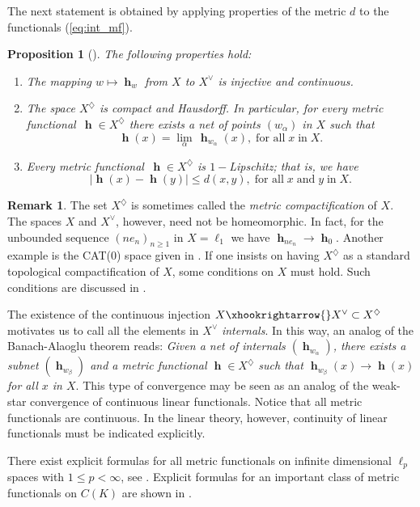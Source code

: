 \documentclass[a4paper,12pt]{article}
\newtheorem{prop}[thm]{Proposition}
\theoremstyle{definition}
\newtheorem{rem}[thm]{Remark}
\DeclareMathOperator{\h}{\mathbf{h}}
\newcommand{\abs}[1]{\lvert#1\rvert}
\numberwithin{equation}{section}
\begin{document}
The next statement is obtained by applying properties of the metric $d$ to the 
functionals (\ref{eq:int_mf}).
\begin{prop}[{\cite[Chapter~3]{GutierrezThesis}}]
The following properties hold:
\begin{enumerate}
	\item The mapping $w\mapsto\h_w$ from $X$ to $X^\vee$ is injective and 
	continuous.
	\item The space $X^{\diamondsuit}$ is compact and Hausdorff. In particular, 
	for every metric functional $\,\h \in X^\diamondsuit$ there exists a net of 
	points $(w_\alpha)$ in $X$ such that 
	$$
		\h(x) = \lim_{\alpha}\,\h_{w_\alpha}(x),\;\text{for all}\;x\;\text{in}\;X. 
	$$
	\item Every metric functional $\,\h \in X^\diamondsuit$ is $1-$Lipschitz; 
	that is, we have
	$$
		\abs{\h(x)-\h(y)} \leq d(x,y),\;\text{for all}\;x\;
		\text{and}\;y\;\text{in}\;X. 
	$$
\end{enumerate}
\end{prop}

\begin{rem}
The set $X^\diamondsuit$ is sometimes called the \emph{metric compactification} 
of $X$. The spaces $X$ and $X^\vee$, however, need not be homeomorphic. In fact, 
for the unbounded sequence $(ne_n)_{n\geq 1}$ in $X=\ell_1$ we have
$\h_{ne_n} \rightarrow \h_0$. Another example is the CAT(0) space given in 
\cite[Example~3.2]{Karlsson2022}. If one insists on having $X^\diamondsuit$ as a 
standard topological compactification of $X$, some conditions on $X$ must hold. 
Such conditions are discussed in \cite[Theorem~2.1]{Daniilidis-et-al2024}. 
\end{rem}

The existence of the continuous injection 
$ 
X\xhookrightarrow{} X^\vee \subset X^\diamondsuit
$
motivates us to call all the elements in $X^\vee$ \emph{internals}. In this way, 
an analog of the Banach-Alaoglu theorem reads: \emph{Given a net of internals
$(\h_{w_\alpha})$, there exists a subnet $(\h_{w_\beta})$ and a metric functional
$\h \in X^\diamondsuit$ such that $\h_{w_\beta}(x) \rightarrow \h(x)$ for all 
$x$ in $X$}. This type of convergence may be seen as an analog of the weak-star 
convergence of continuous linear functionals. Notice that all metric functionals 
are continuous. In the linear theory, however, continuity of 
linear functionals must be indicated explicitly. 

There exist explicit formulas for all metric functionals on infinite dimensional
$\ell_p$ spaces with $1\leq p<\infty$, see \cite{Gutierrez2019-2}. Explicit 
formulas for an important class of metric functionals on $C(K)$ are shown in 
\cite{Walsh2018}.
\end{document}
